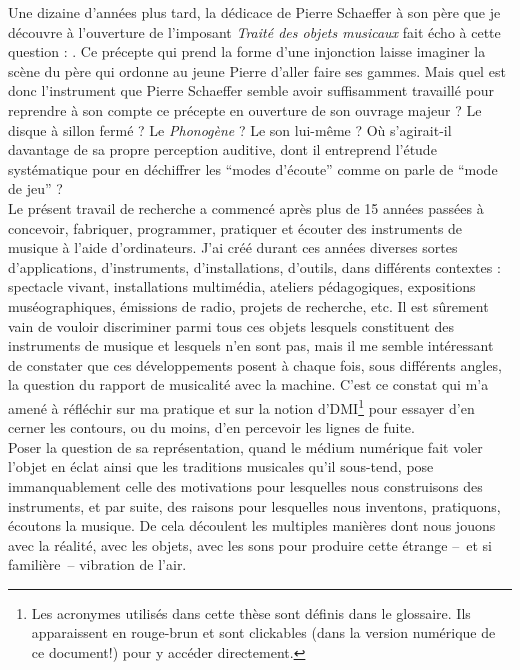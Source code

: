 \indent Une dizaine d'années plus tard, la dédicace de Pierre Schaeffer à son père que je découvre à l'ouverture de l'imposant \textit{Traité des objets musicaux} fait écho à cette question : . 
Ce précepte qui prend la forme d'une injonction laisse imaginer la scène du père qui ordonne au jeune Pierre d'aller faire ses gammes. Mais quel est donc l'instrument que Pierre Schaeffer semble avoir suffisamment travaillé pour reprendre à son compte ce précepte en ouverture de son ouvrage majeur ? Le disque à sillon fermé ? Le \textit{Phonogène} ? Le son lui-même ? Où s'agirait-il davantage de sa propre perception auditive, dont il entreprend l'étude systématique pour en déchiffrer les ``modes d'écoute'' comme on parle de ``mode de jeu'' ?\\
\indent Le présent travail de recherche a commencé après plus de 15 années passées à concevoir, fabriquer, programmer, pratiquer et écouter des instruments de musique à l'aide d'ordinateurs. J'ai créé durant ces années diverses sortes d'applications, d'instruments, d'installations, d'outils, dans différents contextes : spectacle vivant, installations multimédia, ateliers pédagogiques, expositions muséographiques, émissions de radio, projets de recherche, etc. Il est sûrement vain de vouloir discriminer parmi tous ces objets lesquels constituent des instruments de musique et lesquels n'en sont pas, mais il me semble intéressant de constater que ces développements posent à chaque fois, sous différents angles, la question du rapport de musicalité avec la machine. C'est ce constat qui m'a amené à réfléchir sur ma pratique et sur la notion d'\gls{DMI}\footnote{Les acronymes utilisés dans cette thèse sont définis dans le glossaire. Ils apparaissent en \textcolor{glscolor}{rouge-brun} et sont clickables (dans la version numérique de ce document!) pour y accéder directement.} pour essayer d'en cerner les contours, ou du moins, d'en percevoir les lignes de fuite.\\
\indent Poser la question de sa représentation, quand le médium numérique fait voler l’objet en éclat ainsi que les traditions musicales qu’il sous-tend, pose immanquablement celle des motivations pour lesquelles nous construisons des instruments, et par suite, des raisons pour lesquelles nous inventons, pratiquons, écoutons la musique. De cela découlent les multiples manières dont nous jouons avec la réalité, avec les objets, avec les sons pour produire cette étrange --~et si familière~-- vibration de l'air.\\
